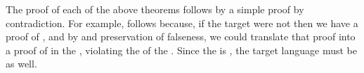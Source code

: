 The proof of each of the above theorems follows by a simple proof by
contradiction.
For example,  follows because, if the target were not
 then we have a proof of \im{\tFalse}, and by  and preservation of falseness, we could translate that proof
into a proof of \im{\sFalse} in the , violating the
 of the .
Since the  is , the target language must be as
well.

